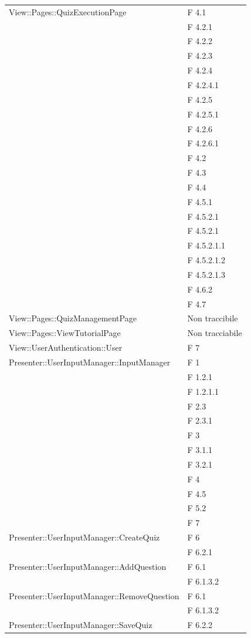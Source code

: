 \documentclass[a4paper,11pt]{article}
\begin{document}
\begin{longtable}{p{}p{}}
\midrule
View::Pages::QuizExecutionPage
								& F 4.1\\
								& F 4.2.1\\
								& F 4.2.2\\
								& F 4.2.3\\
								& F 4.2.4\\
								& F 4.2.4.1\\
								& F 4.2.5\\
								& F 4.2.5.1\\
								& F 4.2.6\\
								& F 4.2.6.1\\
								& F 4.2\\
								& F 4.3\\
								& F 4.4\\
								& F 4.5.1\\
								& F 4.5.2.1\\
								& F 4.5.2.1\\
								& F 4.5.2.1.1\\
								& F 4.5.2.1.2\\
								& F 4.5.2.1.3\\
								& F 4.6.2\\
								& F 4.7\\
\midrule
View::Pages::QuizManagementPage	& Non traccibile\\
\midrule
View::Pages::ViewTutorialPage	& Non tracciabile\\
\midrule
View::UserAuthentication::User	& F 7\\
\midrule
Presenter::UserInputManager::InputManager	& F 1\\
											& F 1.2.1\\
											& F 1.2.1.1\\
											& F 2.3\\
											& F 2.3.1\\
											& F 3\\
											& F 3.1.1\\
											& F 3.2.1\\
											& F 4\\
											& F 4.5\\
											& F 5.2\\
											& F 7\\
\midrule

Presenter::UserInputManager::CreateQuiz		& F 6\\
											& F 6.2.1\\
\midrule
Presenter::UserInputManager::AddQuestion	& F 6.1\\
											& F 6.1.3.2\\
\midrule
Presenter::UserInputManager::RemoveQuestion	& F 6.1\\
											& F 6.1.3.2\\
\midrule
Presenter::UserInputManager::SaveQuiz		& F 6.2.2\\


\end{longtable}
\end{document}
